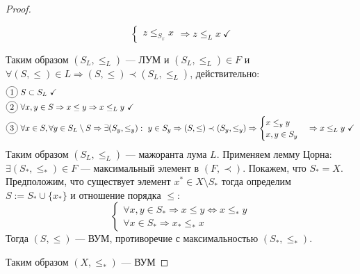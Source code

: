 \begin{proof}
\begin{itemize}
$$\begin{cases}
			z \leq_{S_x} x
		\end{cases} \Rightarrow z \leq_{L} x \ \checkmark
		$$
	\end{itemize}
Таким образом $(S_L, \leq_L)$ --- ЛУМ и $(S_L, \leq_L) \in F$ и $\forall (S, \leq) \in L \Rightarrow (S, \leq) \prec (S_L, \leq_L)$, действительно:
\begin{align*}
	&\circled{1} \ S \subset  S_L \ \checkmark \\
	&\circled{2} \ \forall x,y \in S \Rightarrow x \leq y \Rightarrow x \leq_L y \ \checkmark \\
	&\circled{3} \ \forall x \in S, \forall y \in S_L \setminus S  \Rightarrow \exists (S_y, \leq_y):	\ y \in S_y \Rightarrow (S, \leq) \prec (S_y, \leq_y) \Rightarrow \begin{cases}
		x \leq_y y \\
		x,y \in S_y
	\end{cases}
	\Rightarrow x \leq_L y \ \checkmark 
\end{align*} 
Таким образом $(S_L, \leq_L)$ --- мажоранта лума $L$. Применяем лемму Цорна: $\exists (S_*, \leq_*) \in F$ --- максимальный элемент в $(F, \prec)$. Покажем, что $S_* = X$. Предположим, что существует элемент 
$x^* \in X \setminus S_*$ тогда определим $S:= S_* \cup \{x_*\}$ и отношение порядка $\leq$:
$$
\begin{cases}
	\forall x,y \in S_* \Rightarrow x \leq y \Leftrightarrow x \leq_*y  \\
	\forall x \in S_* \Rightarrow  x_* \leq_* x
\end{cases}
$$
Тогда $(S, \leq)$ --- ВУМ, противоречие с максимальностью $(S_*, \leq_*)$.

 Таким образом $(X, \leq_*)$ --- ВУМ
\end{proof}

